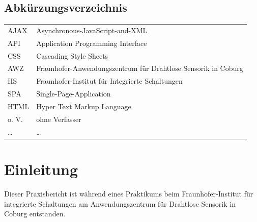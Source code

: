\documentclass[a4paper,12pt,onesided]{report}
\begin{document}
{
\setlength{\cftbeforechapskip}{-.5ex}
\tableofcontents
{}
}
\newpage
\listoffigures
{}

\newpage
\listoftables
{}

\newpage
\lstlistoflistings
{}
\newpage
\section*{Abk\"urzungsverzeichnis}
\begin{tabular}{ll}
  AJAX& Asynchronous-JavaScript-and-XML\\
  API& Application Programming Interface\\
  CSS& Cascading Style Sheets\\
  AWZ& Fraunhofer-Anwendungszentrum f\"ur Drahtlose Sensorik in Coburg\\
  IIS& Fraunhofer-Institut f\"ur Integrierte Schaltungen\\
  SPA& Single-Page-Application\\
  HTML& Hyper Text Markup Language\\
  o. V.& ohne Verfasser\\
  \ldots& \ldots
\end{tabular}

\newpage
\chapter{Einleitung}
Dieser Praxisbericht ist w\"ahrend eines Praktikums beim Fraunhofer-Institut f\"ur integrierte Schaltungen
am Anwendungszentrum f\"ur Drahtlose Sensorik in Coburg entstanden.
\end{document}
